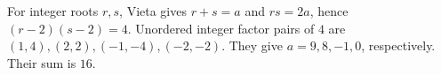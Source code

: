 For integer roots $r,s$, Vieta gives $r+s=a$ and $rs=2a$, hence $(r-2)(s-2)=4$. Unordered integer factor pairs of $4$ are $(1,4),(2,2),(-1,-4),(-2,-2)$. They give $a=9,8,-1,0$, respectively. Their sum is $\boxed{16}$.
